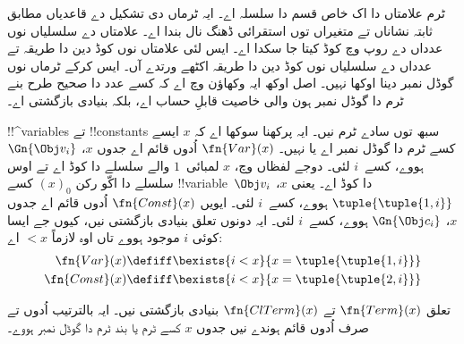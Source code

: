 \documentclass[../../../include/open-logic-section]{subfiles}
\begin{document}

\begin{explain}
ٹرم علامتاں دا اک خاص قسم دا سلسلہ اے۔ ایہ ٹرماں دی تشکیل
دے قاعدیاں مطابق ثابتہ نشاناں تے متغیراں توں استقرائی ڈھنگ
نال بندا اے۔ علامتاں دے سلسلیاں نوں عدداں دے روپ وچ کوڈ کیتا
جا سکدا اے۔ ایس لئی علامتاں نوں کوڈ دین دا طریقہ تے عدداں دے
سلسلیاں نوں کوڈ دین دا طریقہ اکٹھے ورتدے آں۔ ایس کرکے ٹرماں
نوں گوڈل نمبر دینا اوکھا نہیں۔ اصل اوکھ ایہ وکھاؤن وچ اے
کہ کسے عدد دا صحیح طرح بنے ٹرم دا گوڈل نمبر ہون والی خاصیت
قابلِ حساب اے، بلکہ بنیادی بازگشتی اے۔
\end{explain}

!!^{variable}s تے !!{constant}s سبھ توں سادے ٹرم نیں۔ ایہ پرکھنا
سوکھا اے کہ $x$ ایسے کسے ٹرم دا گوڈل نمبر اے یا نہیں۔
$\fn{Var}(x)$ اُدوں قائم اے جدوں $x$، $\Gn{\Obj v_i}$ ہووے،
کسے~$i$ لئی۔ دوجے لفظاں وچ، $x$ لمبائی~$1$ والے سلسلے دا کوڈ
اے تے اوس سلسلے دا اکّو رکن $(x)_0$ کسے !!{variable}~$\Obj v_i$
دا کوڈ اے۔ یعنی $x$، $\tuple{\tuple{1, i}}$ ہووے، کسے~$i$ لئی۔
ایویں $\fn{Const}(x)$ اُدوں قائم اے جدوں $x$، $\Gn{\Obj c_i}$
ہووے، کسے~$i$ لئی۔ ایہ دونوں تعلق بنیادی بازگشتی نیں، کیوں جے
ایسا کوئی $i$ موجود ہووے تاں اوہ لازماً $< x$ اے:
\begin{align*}
  \fn{Var}(x) & \defiff \bexists{i<x}{x = \tuple{\tuple{1, i}}}\\
  \fn{Const}(x) & \defiff \bexists{i<x}{x = \tuple{\tuple{2, i}}}
\end{align*}

\begin{prop}
تعلق $\fn{Term}(x)$ تے $\fn{ClTerm}(x)$ بنیادی بازگشتی نیں۔
ایہ بالترتیب اُدوں تے صرف اُدوں قائم ہوندے نیں جدوں $x$
کسے ٹرم یا بند ٹرم دا گوڈل نمبر ہووے۔
\end{prop}
\end{document}
